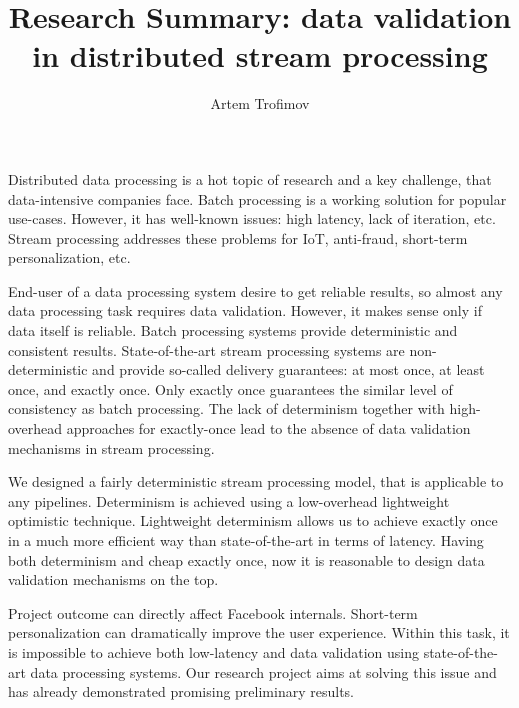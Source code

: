\documentclass[runningheads]{llncs}
\begin{document}
\title {Research Summary: data validation in distributed stream processing}
\author{Artem Trofimov}
\institute{}

\maketitle

Distributed data processing is a hot topic of research and a key challenge, that data-intensive companies face. Batch processing is a working solution for popular use-cases. However, it has well-known issues: high latency, lack of iteration, etc. Stream processing addresses these problems for  IoT, anti-fraud, short-term personalization, etc.

End-user of a data processing system desire to get reliable results, so almost any data processing task requires data validation. However, it makes sense only if data itself is reliable. Batch processing systems provide deterministic and consistent results. State-of-the-art stream processing systems are non-deterministic and provide so-called delivery guarantees: at most once, at least once, and exactly once. Only exactly once guarantees the similar level of consistency as batch processing. The lack of determinism together with high-overhead approaches for exactly-once lead to the absence of data validation mechanisms in stream processing.

We designed a fairly deterministic stream processing model, that is applicable to any pipelines. Determinism is achieved using a low-overhead lightweight optimistic technique. Lightweight determinism allows us to achieve exactly once in a much more efficient way than state-of-the-art in terms of latency. Having both determinism and cheap exactly once, now it is reasonable to design data validation mechanisms on the top.

Project outcome can directly affect Facebook internals. Short-term personalization can dramatically improve the user experience. Within this task, it is impossible to achieve both low-latency and data validation using state-of-the-art data processing systems. Our research project aims at solving this issue and has already demonstrated promising preliminary results.  

% 
% 
\end{document}

